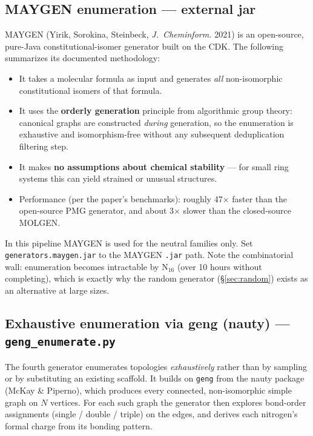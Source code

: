 \documentclass[11pt,a4paper]{article}
\begin{document}
\subsection{MAYGEN enumeration --- external jar}
\label{sec:maygen}

MAYGEN (Yirik, Sorokina, Steinbeck, \emph{J.\ Cheminform.} 2021) is an
open-source, pure-Java constitutional-isomer generator built on the CDK. The
following summarizes its documented methodology:
\begin{itemize}[itemsep=2pt]
  \item It takes a molecular formula as input and generates \emph{all}
    non-isomorphic constitutional isomers of that formula.
  \item It uses the \textbf{orderly generation} principle from algorithmic
    group theory: canonical graphs are constructed \emph{during} generation,
    so the enumeration is exhaustive and isomorphism-free without any
    subsequent deduplication filtering step.
  \item It makes \textbf{no assumptions about chemical stability} --- for
    small ring systems this can yield strained or unusual structures.
  \item Performance (per the paper's benchmarks): roughly 47$\times$ faster
    than the open-source PMG generator, and about 3$\times$ slower than the
    closed-source MOLGEN.
\end{itemize}
In this pipeline MAYGEN is used for the neutral families only. Set
\texttt{generators.maygen.jar} to the MAYGEN \texttt{.jar} path. Note the
combinatorial wall: enumeration becomes intractable by N$_{16}$ (over 10
hours without completing), which is exactly why the random generator
(\S\ref{sec:random}) exists as an alternative at large sizes.

\subsection{Exhaustive enumeration via geng (nauty) --- \texttt{geng\_enumerate.py}}
\label{sec:geng}

The fourth generator enumerates topologies \emph{exhaustively} rather than by
sampling or by substituting an existing scaffold. It builds on
\texttt{geng} from the nauty package (McKay \& Piperno), which produces every
connected, non-isomorphic simple graph on $N$ vertices. For each such graph
the generator then explores bond-order assignments (single / double / triple)
on the edges, and derives each nitrogen's formal charge from its bonding
pattern.
\end{document}
